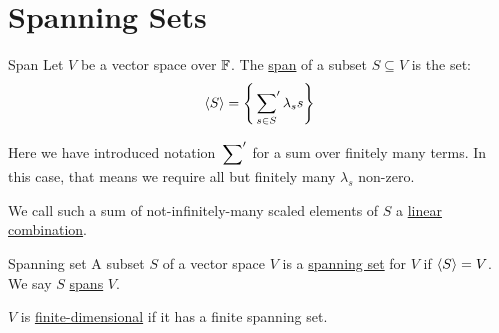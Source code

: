 \documentclass[../Main.tex]{subfiles}
\begin{document}
\section{Spanning Sets}
\begin{definition}{Span}
    Let $V$ be a vector space over $\mathbb{F}$. The \underline{span} of a subset $S \subseteq V$ is the set:
    \begin{equation*}
        \left\langle S \right\rangle = \left\{\sideset{}{'}\sum_{s \in S} \lambda_s s\right\}
    \end{equation*}
\end{definition}
Here we have introduced notation $\sideset{}{'}\sum$ for a sum over finitely many terms. In this case, that means we require all but finitely many $\lambda_s$ non-zero.

We call such a sum of not-infinitely-many scaled elements of $S$ a \underline{linear} \underline{combination}.
\begin{definition}{Spanning set}
    A subset $S$ of a vector space $V$ is a \underline{spanning set} for $V$ if $\left\langle S \right\rangle = V$. We say $S$ \underline{spans} $V$.
\end{definition}
$V$ is \underline{finite-dimensional} if it has a finite spanning set.
\end{document}
